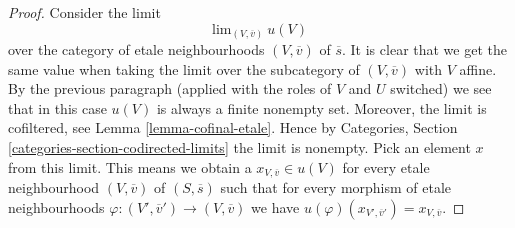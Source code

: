 \begin{proof}
\medskip\noindent
Consider the limit
$$
\text{lim}_{(V, \overline{v})}\ u(V)
$$
over the category of etale neighbourhoods $(V, \overline{v})$ of
$\overline{s}$. It is clear that we get the same value when taking
the limit over the subcategory of $(V, \overline{v})$ with $V$ affine.
By the previous paragraph (applied with the roles of $V$ and $U$ switched)
we see that in this case $u(V)$ is always a finite nonempty set.
Moreover, the limit is cofiltered, see
Lemma \ref{lemma-cofinal-etale}.
Hence by
Categories, Section \ref{categories-section-codirected-limits}
the limit is nonempty. Pick an element $x$ from this limit.
This means we obtain a $x_{V, \overline{v}} \in u(V)$ for
every etale neighbourhood $(V, \overline{v})$ of $(S, \overline{s})$
such that for every morphism of etale neighbourhoods
$\varphi : (V', \overline{v}') \to (V, \overline{v})$ we have
$u(\varphi)(x_{V', \overline{v}'}) = x_{V, \overline{v}}$.


\end{proof}
